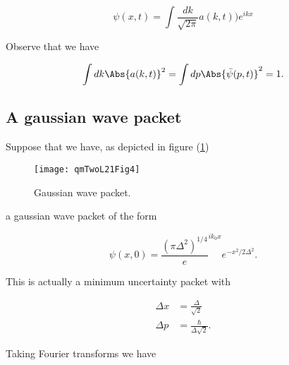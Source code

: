 \begin{equation}\label{eqn:qmTwoL21:n}
\psi(x, t) = \int \frac{dk}{\sqrt{2 \pi}} a(k, t) ) e^{i k x} 
\end{equation}

Observe that we have

\begin{equation}\label{eqn:qmTwoL21:n}
\int dk \Abs{ a(k, t)}^2 = \int dp \Abs{ \bar{\psi}(p, t)}^2 = 1.
\end{equation}

\subsection{A gaussian wave packet}

Suppose that we have, as depicted in figure (\ref{fig:qmTwoL21:qmTwoL21Fig4})
\begin{figure}[htp]
   \centering
   \texttt{[image: qmTwoL21Fig4]}
   \caption{Gaussian wave packet.}\label{fig:qmTwoL21:qmTwoL21Fig4}
\end{figure}

a gaussian wave packet of the form

\begin{equation}\label{eqn:qmTwoL21:n}
\psi(x, 0) = \frac{ (\pi \Delta^2)^{1/4}} e^{i k_0 x} e^{- x^2/2 \Delta^2}.
\end{equation}

This is actually a minimum uncertainty packet with 

\begin{align}\label{eqn:qmTwoL21:n}
\Delta x &= \frac{\Delta}{\sqrt{2}} \\
\Delta p &= \frac{\hbar}{\Delta \sqrt{2}}.
\end{align}

Taking Fourier transforms we have


\EndArticle

